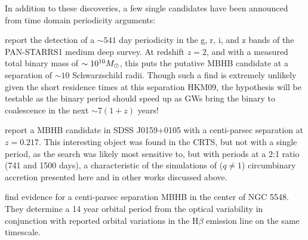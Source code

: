 In addition to these discoveries, a few single candidates have been announced
from time domain periodicity arguments: 

\citep{Liu:7pc:2015} report the detection of a $\sim 541$ day periodicity in
the g, r, i, and z bands of the PAN-STARRS1 medium deep survey. At redshift
$z=2$, and with a measured total binary mass of $\sim 10^{10} {M_{\odot}}$, this
puts the putative MBHB candidate at a separation of $\sim10$ Schwarzschild
radii. Though such a find is extremely unlikely given the short residence
times at this separation HKM09, the hypothesis will be testable as the binary
period should speed up as GWs bring the binary to coalescence in the next
$\sim 7 (1+z)$ years!


\citep{Zheng:MBHB_2P:2015} report a MBHB candidate in SDSS J0159+0105 with a
centi-parsec separation at $z=0.217$. This interesting object was found in the
CRTS, but not with a single period, as the \citep{Graham+2015b} search was
likely most sensitive to, but with periods at a 2:1 ratio (741 and 1500
days), a characteristic of the simulations of ($q \neq 1$) circumbinary
accretion presented here and in other works discussed above.


\citep{LiWang:2016} find evidence for a centi-parsec separation MBHB in the
center of NGC 5548. They determine a 14 year orbital period from the optical
variability in conjunction with reported orbital variations in the H$\beta$
emission line on the same timescale.




